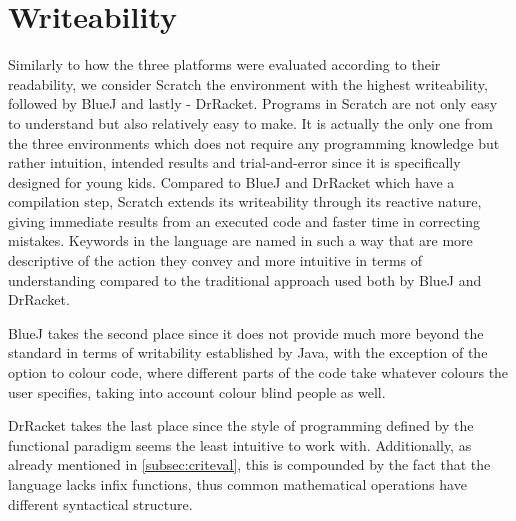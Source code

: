 \section{Writeability}
\label{sec:writability}
Similarly to how the three platforms were evaluated according to their readability, we consider Scratch the environment with the highest writeability, followed by BlueJ and lastly - DrRacket. Programs in Scratch are not only easy to understand but also relatively easy to make. It is actually the only one from the three environments which does not require any programming knowledge but rather intuition, intended results and trial-and-error since it is specifically designed for young kids. Compared to BlueJ and DrRacket which have a compilation step, Scratch extends its writeability through its reactive nature, giving immediate results from an executed code and faster time in correcting mistakes. Keywords in the language are named in such a way that are more descriptive of the action they convey and more intuitive in terms of understanding compared to the traditional approach used both by BlueJ and DrRacket.

BlueJ takes the second place since it does not provide much more beyond the standard in terms of writability established by Java, with the exception of the option to colour code, where different parts of the code take whatever colours the user specifies, taking into account colour blind people as well.

DrRacket takes the last place since the style of programming defined by the functional paradigm seems the least intuitive to work with. Additionally, as already mentioned in \ref{subsec:criteval}, this is compounded by the fact that the language lacks infix functions, thus common mathematical operations have different syntactical structure.